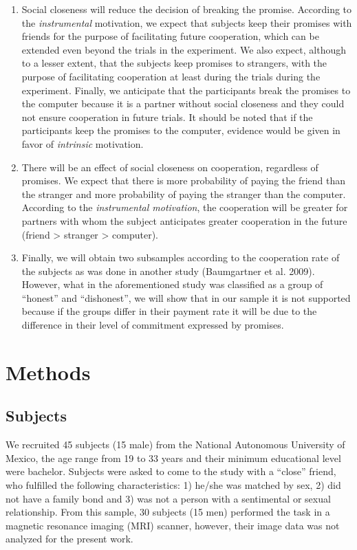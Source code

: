 \documentclass[smallextended]{svjour3}       %
\begin{document}
\begin{enumerate}
\def\labelenumi{\arabic{enumi}.}
\item
  Social closeness will reduce the decision of breaking the promise.
  According to the \emph{instrumental} motivation, we expect that
  subjects keep their promises with friends for the purpose of
  facilitating future cooperation, which can be extended even beyond the
  trials in the experiment. We also expect, although to a lesser extent,
  that the subjects keep promises to strangers, with the purpose of
  facilitating cooperation at least during the trials during the
  experiment. Finally, we anticipate that the participants break the
  promises to the computer because it is a partner without social
  closeness and they could not ensure cooperation in future trials. It
  should be noted that if the participants keep the promises to the
  computer, evidence would be given in favor of \emph{intrinsic}
  motivation.
\item
  There will be an effect of social closeness on cooperation, regardless
  of promises. We expect that there is more probability of paying the
  friend than the stranger and more probability of paying the stranger
  than the computer. According to the \emph{instrumental motivation},
  the cooperation will be greater for partners with whom the subject
  anticipates greater cooperation in the future (friend \textgreater{}
  stranger \textgreater{} computer).
\item
  Finally, we will obtain two subsamples according to the cooperation
  rate of the subjects as was done in another study (Baumgartner et al.
  2009). However, what in the aforementioned study was classified as a
  group of ``honest'' and ``dishonest'', we will show that in our sample
  it is not supported because if the groups differ in their payment rate
  it will be due to the difference in their level of commitment
  expressed by promises.
\end{enumerate}

\hypertarget{methods}{%
\section{Methods}\label{methods}}

\hypertarget{subjects}{%
\subsection{Subjects}\label{subjects}}

We recruited 45 subjects (15 male) from the National Autonomous
University of Mexico, the age range from 19 to 33 years and their
minimum educational level were bachelor. Subjects were asked to come to
the study with a ``close'' friend, who fulfilled the following
characteristics: 1) he/she was matched by sex, 2) did not have a family
bond and 3) was not a person with a sentimental or sexual relationship.
From this sample, 30 subjects (15 men) performed the task in a magnetic
resonance imaging (MRI) scanner, however, their image data was not
analyzed for the present work.
\end{document}
